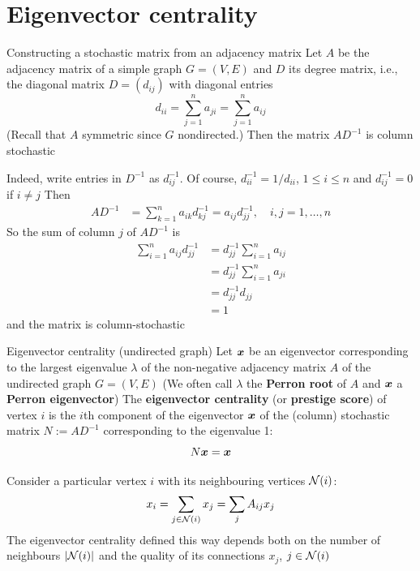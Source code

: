 \documentclass[aspectratio=169]{beamer}\usepackage[]{graphicx}\usepackage[]{xcolor}
\begin{document}
\section{Eigenvector centrality}

\begin{frame}{Constructing a stochastic matrix from an adjacency matrix}
	Let $A$ be the adjacency matrix of a simple graph $G=(V,E)$ and $D$ its degree matrix, i.e., the diagonal matrix $D=(d_{ij})$ with diagonal entries
	\[
		d_{ii} = \sum_{j=1}^n a_{ji} =\sum_{j=1}^n a_{ij}
	\]
	(Recall that $A$ symmetric since $G$ nondirected.)
	Then the matrix $AD^{-1}$ is column stochastic
\end{frame}

\begin{frame}
	Indeed, write entries in $D^{-1}$ as $d_{ij}^{-1}$. Of course, $d_{ii}^{-1} = 1/d_{ii}$, $1\leq i\leq n$ and $d_{ij}^{-1} = 0$ if $i\neq j$
	\vfill
	Then
	\begin{align*}
		AD^{-1} &= \sum_{k=1}^n a_{ik}d_{kj}^{-1}
		= a_{ij}d_{jj}^{-1}
		,\quad i,j=1,\ldots,n
	\end{align*}
	So the sum of column $j$ of $AD^{-1}$ is 
	\begin{align*}
		\sum_{i=1}^n a_{ij}d_{jj}^{-1} 
		&= d_{jj}^{-1} \sum_{i=1}^n a_{ij} \\
		&= d_{jj}^{-1} \sum_{i=1}^n a_{ji} \\
		&= d_{jj}^{-1} d_{jj} \\
		&= 1
	\end{align*}
	and the matrix is column-stochastic
\end{frame}
	
\begin{frame}{Eigenvector centrality (undirected graph)}
Let $\bm{x}$ be an eigenvector corresponding to the largest eigenvalue $\lambda$ of the non-negative adjacency matrix $A$ of the undirected graph $G = (V, E)$
\vfill
(We often call $\lambda$ the \textbf{Perron root} of $A$ and $\bm{x}$ a \textbf{Perron eigenvector})
\vfill
The \textbf{eigenvector centrality} (or \textbf{prestige score}) of vertex $i$ is the $i$th component of the eigenvector $\bm{x}$ of the (column) stochastic matrix $N := AD^{-1}$ corresponding to the eigenvalue 1:
\[
	N\bm{x} = \bm{x}
\]
\end{frame}

\begin{frame}
Consider a particular vertex $i$ with its neighbouring vertices $\mathcal{N}(i)$:
\[
	x_i = \sum_{j\in\mathcal{N}(i)} x_j 
	= \sum_j A_{ij} x_j	
\]
\vfill
The eigenvector centrality defined this way depends both on the number of neighbours $|\mathcal{N}(i)|$ and the quality of its connections $x_j$, $j\in\mathcal{N}(i)$
\end{frame}
\end{document}
